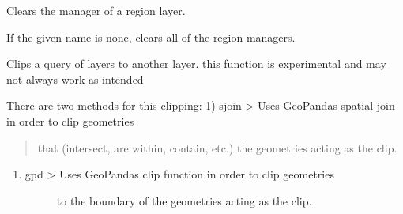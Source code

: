 \documentclass[letterpaper,10pt,english]{sphinxmanual}
\begin{document}
\begin{fulllineitems}

\begin{fulllineitems}
\label{\detokenize{builder:geohexviz.builder.PlotBuilder.clear_region_manager}}
\sphinxAtStartPar
Clears the manager of a region layer.

\sphinxAtStartPar
If the given name is none, clears all of the region managers.

\end{fulllineitems}


\begin{fulllineitems}
\label{\detokenize{builder:geohexviz.builder.PlotBuilder.clip_layers}}
\sphinxAtStartPar
Clips a query of layers to another layer.
this function is experimental and may not always work as intended

\sphinxAtStartPar
There are two methods for this clipping:
1) sjoin \sphinxhyphen{}\textgreater{} Uses GeoPandas spatial join in order to clip geometries
\begin{quote}

\sphinxAtStartPar
that (intersect, are within, contain, etc.) the geometries
acting as the clip.
\end{quote}
\begin{enumerate}
%
\setcounter{enumi}{1}
\item {} \begin{description}
\item[{gpd  \sphinxhyphen{}\textgreater{}  Uses GeoPandas clip function in order to clip geometries}] \leavevmode
\sphinxAtStartPar
to the boundary of the geometries acting as the clip.


\end{description}
\end{enumerate}
\end{fulllineitems}
\end{fulllineitems}
\end{document}
